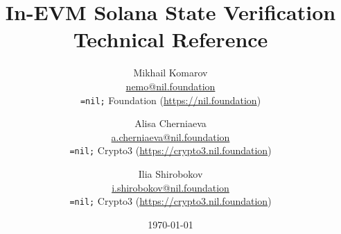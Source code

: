 \setlength{\droptitle}{-4\baselineskip} %

\pretitle{\begin{center}\Huge\bfseries} %
\title{In-EVM Solana State Verification \\[1ex] \large Technical Reference} %
\posttitle{\end{center}} %
\author{ %
    \protect\begin{tabular}{c} \normalsize Mikhail Komarov \\
	    \normalsize \href{mailto:nemo@nil.foundation}{nemo@nil.foundation} \\
	    \normalsize \texttt{=nil;} Foundation (\url{https://nil.foundation})\\ 
	\protect\end{tabular}
    \and
	\protect\begin{tabular}{c} \normalsize Alisa Cherniaeva \\
	    \normalsize \href{mailto:a.cherniaeva@nil.foundation}{a.cherniaeva@nil.foundation} \\
	    \normalsize \texttt{=nil;} Crypto3 (\url{https://crypto3.nil.foundation})\\ 
	\protect\end{tabular}
	\and
	\protect\begin{tabular}{c} \normalsize Ilia Shirobokov \\
	    \normalsize \href{mailto:i.shirobokov@nil.foundation}{i.shirobokov@nil.foundation} \\
	    \normalsize \texttt{=nil;} Crypto3 (\url{https://crypto3.nil.foundation})\\ 
	\protect\end{tabular}
}
\date{\today} %
